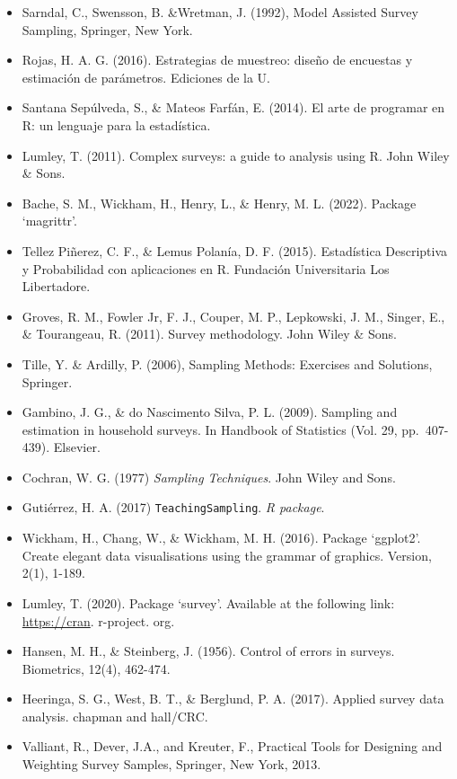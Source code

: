 \documentclass[
  12pt,
]{book}
\begin{document}
\begin{itemize}
\item
  Sarndal, C., Swensson, B. \&Wretman, J. (1992), Model Assisted Survey Sampling, Springer, New York.
\item
  Rojas, H. A. G. (2016). Estrategias de muestreo: diseño de encuestas y estimación de parámetros. Ediciones de la U.
\item
  Santana Sepúlveda, S., \& Mateos Farfán, E. (2014). El arte de programar en R: un lenguaje para la estadística.
\item
  Lumley, T. (2011). Complex surveys: a guide to analysis using R. John Wiley \& Sons.
\item
  Bache, S. M., Wickham, H., Henry, L., \& Henry, M. L. (2022). Package `magrittr'.
\item
  Tellez Piñerez, C. F., \& Lemus Polanía, D. F. (2015). Estadística Descriptiva y Probabilidad con aplicaciones en R. Fundación Universitaria Los Libertadore.
\item
  Groves, R. M., Fowler Jr, F. J., Couper, M. P., Lepkowski, J. M., Singer, E., \& Tourangeau, R. (2011). Survey methodology. John Wiley \& Sons.
\item
  Tille, Y. \& Ardilly, P. (2006), Sampling Methods: Exercises and Solutions, Springer.
\item
  Gambino, J. G., \& do Nascimento Silva, P. L. (2009). Sampling and estimation in household surveys. In Handbook of Statistics (Vol. 29, pp.~407-439). Elsevier.
\item
  Cochran, W. G. (1977) \emph{Sampling Techniques}. John Wiley and Sons.
\item
  Gutiérrez, H. A. (2017) \texttt{TeachingSampling}. \emph{R package}.
\item
  Wickham, H., Chang, W., \& Wickham, M. H. (2016). Package `ggplot2'. Create elegant data visualisations using the grammar of graphics. Version, 2(1), 1-189.
\item
  Lumley, T. (2020). Package `survey'. Available at the following link: \url{https://cran}. r-project. org.
\item
  Hansen, M. H., \& Steinberg, J. (1956). Control of errors in surveys. Biometrics, 12(4), 462-474.
\item
  Heeringa, S. G., West, B. T., \& Berglund, P. A. (2017). Applied survey data analysis. chapman and hall/CRC.
\item
  Valliant, R., Dever, J.A., and Kreuter, F., Practical Tools for Designing and Weighting Survey Samples, Springer, New York, 2013.

\end{itemize}
\end{document}
